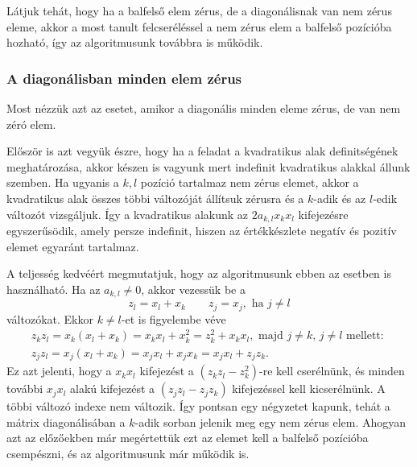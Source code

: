 \documentclass[a4paper, showtrims]{memoir}
\theoremstyle{plain}
\theoremstyle{remark}
\theoremstyle{definition}
\begin{document}
Látjuk tehát, hogy ha a balfelső elem zérus, de a diagonálisnak van nem zérus eleme, 
akkor a most tanult felcseréléssel a nem zérus elem a balfelső pozícióba hozható, így az algoritmusunk továbbra is működik.

\subsubsection{A diagonálisban minden elem zérus}
Most nézzük azt az esetet, amikor a diagonális minden eleme zérus, de van nem zéró elem.

Először is azt vegyük észre, hogy ha a feladat a kvadratikus alak definitségének meghatározása, 
akkor készen is vagyunk mert indefinit kvadratikus alakkal állunk szemben.
Ha ugyanis a $k,l$ pozíció tartalmaz nem zérus elemet, 
akkor a kvadratikus alak összes többi változóját állítsuk zérusra és a $k$-adik és az $l$-edik változót vizsgáljuk.
Így a kvadratikus alakunk az $2a_{k,l}x_kx_l$ kifejezésre egyszerűsödik, 
amely persze indefinit, hiszen az értékkészlete negatív és pozitív elemet egyaránt tartalmaz.

A teljesség kedvéért megmutatjuk, 
hogy az algoritmusunk ebben az esetben is használható.
Ha az $a_{k,l}\neq 0$, akkor vezessük be a 
\[
    z_l=x_l+x_k\qquad z_j=x_j, \text{ ha }j\neq l
\]
változókat.
Ekkor $k\neq l$-et is figyelembe véve
\begin{multline*}
z_kz_l=x_k\left( x_l+x_k \right)=x_kx_l+x_k^2=z_k^2+x_kx_l,
\text{ majd $j\neq k$, $j\neq l$ mellett: }\\
z_jz_l=x_j\left( x_l+x_k \right)=x_jx_l+x_jx_k=x_jx_l+z_jz_k.
\end{multline*}
Ez azt jelenti, hogy a $x_kx_l$ kifejezést a $(z_kz_l-z_k^2)$-re kell cserélnünk,
és minden további $x_jx_l$ alakú kifejezést a $(z_jz_l-z_jz_k)$ kifejezéssel kell kicserélnünk.
A többi változó indexe nem változik.
Így pontsan egy négyzetet kapunk, 
tehát a mátrix diagonálisában a $k$-adik sorban jelenik meg egy nem zérus elem.
Ahogyan azt az előzőekben már megértettük ezt az elemet kell a balfelső pozícióba csempészni, 
és az algoritmusunk már működik is.
\end{document}
